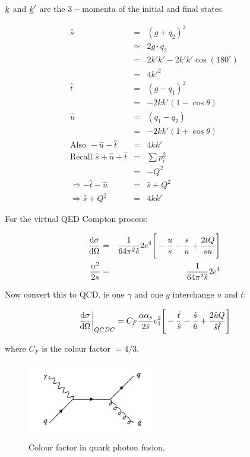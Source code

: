 $\underline{k}$ and $\underline{k}'$ are the $3-$momenta of the initial and final states.

\begin{eqnarray*}
  \hat{s} & = & \left(g + q_2\right)^2 \\
  & \simeq & 2g \cdot q_2 \\
  & = & 2k'k' - 2k'k'\cos(180^{\circ}) \\
  & = & 4k'^2 \\
  \hat{t} & = & \left(g - q_1\right)^2 \\
  & = & -2kk'\left(1 - \cos\theta\right) \\
  \hat{u} & = & \left(q_1 - q_2\right) \\
  & = & -2kk'\left(1 + \cos\theta\right) \\
  \textrm{Also } -\hat{u} - \hat{t} & = & 4kk' \\
  \textrm{Recall } \hat{s} + \hat{u} + \hat{t} & = & \sum p_i^2 \\
  & = & -Q^2 \\
  \Rightarrow - \hat{t} - \hat{u} & = & \hat{s} + Q^2 \\
  \Rightarrow \hat{s} + Q^2 & = & 4kk'
\end{eqnarray*}

For the virtual QED Compton process:

\begin{eqnarray*}
  \frac{\mathrm{d}\sigma}{\mathrm{d}\Omega} & = & \frac{1}{64\pi^2\hat{s}}2e^4\Bigg[ -\frac{u}{s} - \frac{s}{u} + \frac{2tQ}{su} \Bigg] \\
  \frac{\alpha^2}{2s} & = & \frac{1}{64\pi^2\hat{s}}2e^4
\end{eqnarray*}

Now convert this to QCD.  ie one $\gamma$ and one $g$ interchange $u$ and $t$:

\[
  \left.\frac{\mathrm{d}\sigma}{\mathrm{d}\Omega}\right|_{QCDC} = C_F\frac{\alpha\alpha_s}{2\hat{s}}e_1^2\Bigg[ -\frac{\hat{t}}{\hat{s}} - \frac{\hat{s}}{\hat{u}} + \frac{2\hat{u}Q}{\hat{s}\hat{t}} \Bigg] 
\]

where $C_F$ is the colour factor $= 4/3$.

\begin{figure}[!htb]
  \begin{center}
    \includegraphics[width=0.5\textwidth]{images/web_feynman/image_72.png}
    \caption[Colour factor in quark photon fusion]{Colour factor in quark photon fusion.}
    \label{fig:ch14_QGammaToQGColour}
  \end{center}
\end{figure}

